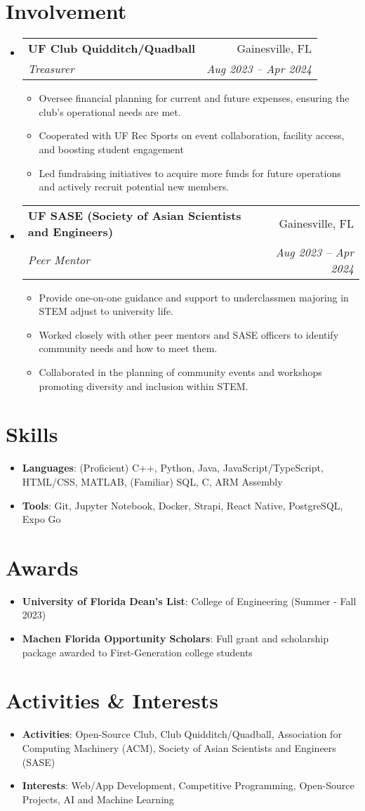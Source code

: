 \documentclass[letterpaper,11pt]{article}
\makeatletter
\newcommand{\resumeItemSkills}[2]{
  \item\normalsize{
    \textbf{#1}{: #2 \vspace{-2pt}}
  }
}
\newcommand{\resumeItemExperience}[1]{
  \item\small{
    {#1 \vspace{-2pt}}
  }
}
\newcommand{\resumeSubheading}[4]{
  \vspace{-1pt}\item
    \begin{tabular*}{0.97\textwidth}{l@{\extracolsep{\fill}}r}
      \textbf{#1} & #2 \\
      \textit{\small#3} & \textit{\small #4} \\
    \end{tabular*}\vspace{-6pt}
}
\newcommand{\resumeSubItemSkills}[2]{\resumeItemSkills{#1}{#2}\vspace{-4pt}}
\newcommand{\resumeSubHeadingListStart}{\begin{itemize}[leftmargin=*, label={}]}
\newcommand{\resumeSubHeadingListStartSkillsAwards}{\begin{itemize}[leftmargin=*]}
\newcommand{\resumeSubHeadingListEnd}{\end{itemize}}
\newcommand{\resumeItemListStart}{\begin{itemize}}
\newcommand{\resumeItemListEnd}{\end{itemize}\vspace{-5pt}}
\makeatother
\begin{document}
\section{Involvement}
    \resumeSubHeadingListStart
      \resumeSubheading
        {UF Club Quidditch/Quadball}{Gainesville, FL}
        {Treasurer}{Aug 2023 -- Apr 2024}
        \resumeItemListStart
          \resumeItemExperience
            {Oversee financial planning for current and future expenses, ensuring the club’s operational needs are met.}
          \resumeItemExperience
            {Cooperated with UF Rec Sports on event collaboration, facility access, and boosting student engagement}
          \resumeItemExperience
            {Led fundraising initiatives to acquire more funds for future operations and actively recruit potential new members.}
        \resumeItemListEnd
        \resumeSubheading
        {UF SASE (Society of Asian Scientists and Engineers)}{Gainesville, FL}
        {Peer Mentor}{Aug 2023 -- Apr 2024}
        \resumeItemListStart
          \resumeItemExperience
            {Provide one-on-one guidance and support to underclassmen majoring in STEM adjust to university life.}
          \resumeItemExperience
            {Worked closely with other peer mentors and SASE officers to identify community needs and how to meet them.}
          \resumeItemExperience
            {Collaborated in the planning of community events and workshops promoting diversity and inclusion within STEM.}
        \resumeItemListEnd
    \resumeSubHeadingListEnd
          
\section{Skills}
  \resumeSubHeadingListStartSkillsAwards
    \resumeSubItemSkills{Languages}{(Proficient) C++, Python, Java, JavaScript/TypeScript, HTML/CSS, MATLAB, \newline
    (Familiar) SQL, C, ARM Assembly}
    \resumeSubItemSkills{Tools}{Git, Jupyter Notebook, Docker, Strapi, React Native, PostgreSQL, Expo Go}
  \resumeSubHeadingListEnd

\section{Awards}
  \resumeSubHeadingListStartSkillsAwards
    \resumeSubItemSkills{University of Florida Dean's List}
      {College of Engineering (Summer - Fall 2023)}
    \resumeSubItemSkills{Machen Florida Opportunity Scholars}
      {Full grant and scholarship package awarded to First-Generation college students}
  \resumeSubHeadingListEnd

  \section{Activities \& Interests}
  \resumeSubHeadingListStartSkillsAwards
    \resumeSubItemSkills{Activities}
      {Open-Source Club, Club Quidditch/Quadball, Association for Computing Machinery (ACM), Society of Asian 
      Scientists and Engineers (SASE)}
    \resumeSubItemSkills{Interests}
      {Web/App Development, Competitive Programming, Open-Source Projects, AI and Machine Learning}
  \resumeSubHeadingListEnd
  
\end{document}
